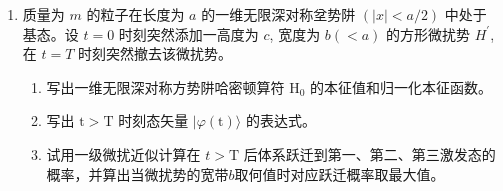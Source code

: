 \begin{enumerate}
\item 
质量为 $m$ 的粒子在长度为 $a$ 的一维无限深对称坌势阱 $(|x|<a / 2)$ 中处于
基态。设 $t=0$ 时刻突然添加一高度为 $c$, 宽度为 $b(<a)$ 的方形微扰势 $H^{\prime}$, 在 $t=T$ 时刻突然撤去该微扰势。
\begin{enumerate}
	\item
	写出一维无限深对称方势阱哈密顿算符 $\mathrm{H}_{0}$ 的本征值和归一化本征函数。
	\item 
	写出 $\mathrm{t}>\mathrm{T}$ 时刻态矢量 $|\varphi(\mathrm{t})\rangle$ 的表达式。
	\item 
	试用一级微扰近似计算在 $t>\mathrm{T}$ 后体系跃迁到第一、第二、第三激发态的概率，并算出当微扰势的宽带$ b $取何值时对应跃迁概率取最大值。
	
	
	
\end{enumerate}

\banswer{
	
}


\end{enumerate}

